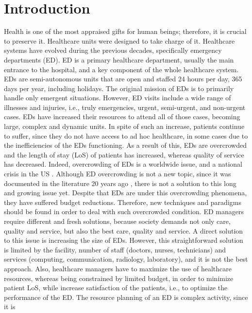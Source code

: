 \documentclass[11pt]{article} %
\begin{document}
\section{Introduction}
\label{sec:intro}

Health is one of the most appraised gifts for human beings; therefore, it is crucial to preserve it. Healthcare units were designed to 
take charge of it. Healthcare systems have evolved during the previous decades, specifically emergency departments (ED). ED is a 
primary healthcare department, usually the main entrance to the hospital, and a key component of the whole healthcare system. EDs 
are semi-autonomous units that are open and staffed 24 hours per day, 365 days per year, including holidays. The original mission of 
EDs is to primarily handle only emergent situations. However, ED visits include a wide range of illnesses and injuries, i.e., truly 
emergencies, urgent, semi-urgent, and non-urgent cases. EDs have increased their resources to attend all of those cases, becoming large, complex and dynamic units. In spite of such an increase, patients continue to suffer, since they do not have access to ad hoc
healthcare, in some cases due to the inefficiencies of the EDs functioning. As a result of this,  EDs are overcrowded and the length of 
stay (LoS) of patients has increased, whereas quality of service has decreased. Indeed, overcrowding of EDs is a worldwide issue, 
and a national crisis in the US \cite{national2007}. Although ED overcrowding is not a new topic, since it was documented in the 
literature 20 years ago \cite{Lynn1991287}, there is not a solution to this long and growing issue yet. Despite that EDs are under this 
overcrowding phenomena, they have suffered budget reductions. Therefore, new techniques and paradigms should be found  in 
order to deal with such overcrowded condition. ED managers require different and fresh solutions, because society demands not only 
care, quality and service, but also the best care, quality and service. A direct solution to this issue is increasing the size of EDs. 
However, this straightforward solution is limited by the facility, number of staff (doctors, nurses, technicians) and services 
(computing, communication, radiology, laboratory), and it is not the best approach.  Also, healthcare managers have to maximize the 
use of healthcare resources, whereas being constrained by limited budget, in order to minimize patient LoS, while increase 
satisfaction of the patients, i.e., to optimize the performance of the ED. The resource planning of an ED is complex activity, since it is 
\end{document}
